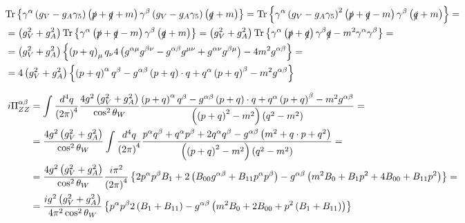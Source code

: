 \begin{align*}
& \mathrm{Tr} \left\lbrace \gamma^{\alpha} \left( g_V - g_A \gamma_5 \right) \left( \slashed{p}+\slashed{q}+m \right) \gamma^{\beta} \left( g_V - g_A \gamma_5 \right) \left( \slashed{q}+m \right) \right\rbrace = \mathrm{Tr} \left\lbrace \gamma^{\alpha} \left( g_V - g_A \gamma_5 \right)^2 \left( \slashed{p}+\slashed{q}-m \right) \gamma^{\beta} \left( \slashed{q}+m \right) \right\rbrace = & \\
& = \left( g_V^2 + g_A^2 \right) \mathrm{Tr} \left\lbrace \gamma^{\alpha} \left( \slashed{p} + \slashed{q} - m \right) \gamma^{\beta} \left( \slashed{q} + m \right) \right\rbrace = \left( g_V^2 + g_A^2 \right) \mathrm{Tr} \left\lbrace \gamma^{\alpha} \left( \slashed{p} + \slashed{q} \right) \gamma^{\beta} \slashed{q} - m^2 \gamma^{\alpha}\gamma^{\beta} \right\rbrace = & \\
& = \left( g_V^2 + g_A^2 \right) \left\lbrace \left( p+q \right)_{\mu} q_{\nu} 4 \left( g^{\alpha\mu}g^{\beta\nu} - g^{\alpha\beta}g^{\mu\nu} + g^{\alpha\nu}g^{\beta\mu} \right) - 4m^2 g^{\alpha\beta} \right\rbrace = & \\
& = 4 \left( g_V^2 + g_A^2 \right) \left\lbrace \left( p+q \right)^{\alpha}q^{\beta} - g^{\alpha\beta} \left( p+q \right) \cdot q + q^{\alpha} \left( p+q \right)^{\beta} - m^2 g^{\alpha\beta} \right\rbrace &
\end{align*}

\begin{align*}
i\Pi^{\alpha\beta}_{ZZ} & = \int \frac{d^4q}{\left( 2\pi \right)^4} \frac{4g^2\left(g_V^2 + g_A^2 \right)}{\cos^2\theta_W} \frac{\left( p+q \right)^{\alpha}q^{\beta} - g^{\alpha\beta} \left( p+q \right) \cdot q + q^{\alpha} \left( p+q \right)^{\beta} - m^2 g^{\alpha\beta}}{\left( \left( p+q \right)^2 -m^2 \right) \left( q^2 - m^2 \right)} = & \\
& = \frac{4g^2\left(g_V^2 + g_A^2 \right)}{\cos^2\theta_W} \int \frac{d^4q}{\left( 2\pi \right)^4} \frac{p^{\alpha}q^{\beta}+q^{\alpha}p^{\beta}+2q^{\alpha}q^{\beta} - g^{\alpha\beta} \left( m^2 + q \cdot p + q^2 \right)}{\left( \left( p+q \right)^2 -m^2 \right) \left( q^2 - m^2 \right)} = & \\
& = \frac{4g^2\left(g_V^2 + g_A^2 \right)}{\cos^2\theta_W} \frac{i\pi^2}{\left( 2\pi \right)^4} \left\lbrace 2 p^{\alpha}p^{\beta} B_1 + 2 \left( B_{00} g^{\alpha\beta} + B_{11} p^{\alpha}p^{\beta} \right) - g^{\alpha\beta} \left( m^2 B_0 + B_1 p^2 + 4 B_{00} + B_{11} p^2 \right) \right\rbrace = & \\
& = \frac{ig^2\left(g_V^2 + g_A^2 \right)}{4\pi^2\cos^2\theta_W} \left\lbrace p^{\alpha}p^{\beta} 2 \left( B_1 + B_{11} \right) - g^{\alpha\beta} \left( m^2 B_0 + 2 B_{00} + p^2 \left( B_1 + B_{11} \right) \right) \right\rbrace
\end{align*}

